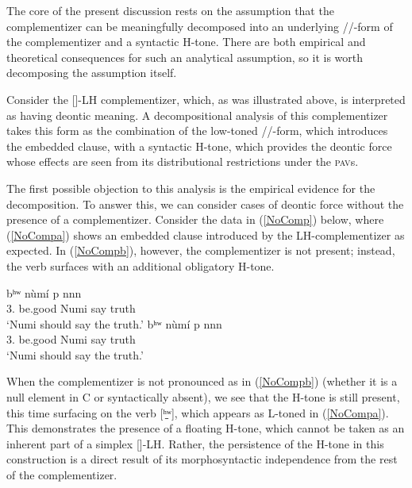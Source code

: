 \documentclass[output=paper,colorlinks,citecolor=brown]{langscibook}
\begin{document}
The core of the present discussion rests on the assumption that the complementizer can be meaningfully decomposed into an underlying /\mbuL/-form of the complementizer and a syntactic H-tone. There are both empirical and theoretical consequences for such an analytical assumption, so it is worth decomposing the assumption itself.

Consider the [\mbuLH]-LH complementizer, which, as was illustrated above, is interpreted as having deontic meaning. A decompositional analysis of this complementizer takes this form as the combination of the low-toned /\mbuL/-form, which introduces the embedded clause, with a syntactic H-tone, which provides the deontic force whose effects are seen from its distributional restrictions under the \textsc{pav}s.

The first possible objection to this analysis is the empirical evidence for the decomposition. To answer this, we can consider cases of deontic force without the presence of a complementizer. Consider the data in (\ref{NoComp}) below, where (\ref{NoCompa}) shows an embedded clause introduced by the LH-complementizer as expected. In (\ref{NoCompb}), however, the complementizer is not present; instead, the verb surfaces with an additional obligatory H-tone.

\ea \label{NoComp}
    \begin{xlist}
    \ex \label{NoCompa}
         {bʰʷ\ooL} {\mbuLH} {n{ù}m{í}} {p} {n\baruH\ds n\baruH n\schwaH} \\
             {3.} {be.good} {} {Numi} {say} {truth} \\
        \glt `Numi should say the truth.'
    \ex \label{NoCompb}
         {bʰʷ\ooL\ooH} {n{ù}m{í}} {p} {n\baruH\ds n\baruH n\schwaH} \\
             {3.} {be.good} {Numi} {say} {truth} \\
        \glt `Numi should say the truth.'
    \end{xlist}
\z

When the complementizer is not pronounced as in (\ref{NoCompb}) (whether it is a null element in C or syntactically absent), we see that the H-tone is still present, this time surfacing on the verb [\b{ʰʷ}\ooL\ooH], which appears as L-toned in (\ref{NoCompa}). This demonstrates the presence of a floating H-tone, which cannot be taken as an inherent part of a simplex [\mbuLH]-LH. Rather, the persistence of the H-tone in this construction is a direct result of its morphosyntactic independence from the rest of the complementizer.
\end{document}
